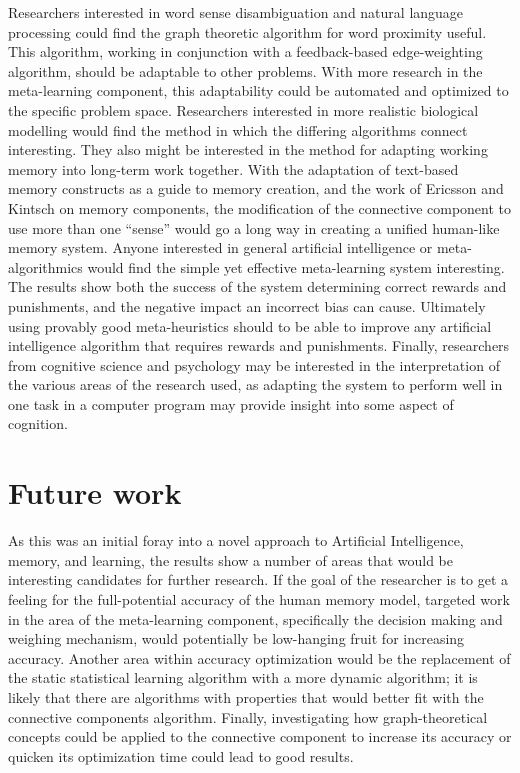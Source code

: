 Researchers interested in word sense disambiguation and natural language processing could find the graph theoretic algorithm for word proximity useful.  This algorithm, working in conjunction with a feedback-based edge-weighting algorithm, should be adaptable to other problems.  With more research in the meta-learning component, this adaptability could be automated and optimized to the specific problem space.  Researchers interested in more realistic biological modelling would find the method in which the differing algorithms connect interesting. They also might be interested in the method for adapting working memory into long-term work together.  With the adaptation of text-based memory constructs as a guide to memory creation, and the work of Ericsson and Kintsch on memory components, the modification of the connective component to use more than one ``sense'' would go a long way in creating a unified human-like memory system.  Anyone interested in general artificial intelligence or meta-algorithmics would find the simple yet effective meta-learning system interesting.  The results show both the success of the system determining correct rewards and punishments, and the negative impact an incorrect bias can cause. Ultimately using provably good meta-heuristics should to be able to improve any artificial intelligence algorithm that requires rewards and punishments.  Finally, researchers from cognitive science and psychology may be interested in the interpretation of the various areas of the research used, as adapting the system to perform well in one task in a computer program may provide insight into some aspect of cognition.


\section{Future work}

As this was an initial foray into a novel approach to Artificial Intelligence, memory, and learning, the results show a number of areas that would be interesting candidates for further research.  If the goal of the researcher is to get a feeling for the full-potential accuracy of the human memory model, targeted work in the area of the meta-learning component, specifically the decision making and weighing mechanism, would potentially be low-hanging fruit for increasing accuracy.  Another area within accuracy optimization would be the replacement of the static statistical learning algorithm with a more dynamic algorithm; it is likely that there are algorithms with properties that would better fit with the connective components algorithm. Finally, investigating how graph-theoretical concepts could be applied to the connective component to increase its accuracy or quicken its optimization time could lead to good results.

